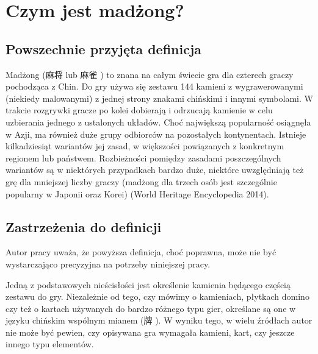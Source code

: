 \introduction
\section{Czym jest madżong?}
\subsection{Powszechnie przyjęta definicja}
Madżong (麻将  lub 麻雀 ) to znana na całym świecie
gra dla czterech graczy pochodząca z Chin. Do gry używa się zestawu 144 kamieni
z wygrawerowanymi (niekiedy malowanymi) z jednej strony znakami chińskimi i
innymi symbolami. W trakcie rozgrywki gracze po kolei dobierają i odrzucają
kamienie w celu uzbierania jednego z ustalonych układów. Choć największą
popularność osiągnęła w Azji, ma również duże grupy odbiorców na pozostałych
kontynentach.
Istnieje kilkadziesiąt wariantów jej zasad, w większości powiązanych z
konkretnym regionem lub państwem. Rozbieżności pomiędzy zasadami poszczególnych
wariantów są w niektórych przypadkach bardzo duże, niektóre uwzględniają też grę
dla mniejszej liczby graczy (madżong dla trzech osób jest szczególnie popularny
w Japonii oraz Korei) (World Heritage Encyclopedia 2014).
\subsection{Zastrzeżenia do definicji}
\label{zastrzezenia}
Autor pracy uważa, że powyższa definicja, choć poprawna, może nie być
wystarczająco precyzyjna na potrzeby niniejszej pracy.

Jedną z podstawowych nieścisłości jest określenie kamienia będącego częścią
zestawu do gry.
Niezależnie od tego, czy mówimy o kamieniach, płytkach domino czy też o kartach
używanych do bardzo różnego typu gier, określane są one w języku chińskim
wspólnym mianem  (牌 ). W wyniku tego, w wielu źródłach
autor nie może być pewien, czy opisywana gra wymagała kamieni, kart, czy jeszcze
innego typu elementów.

